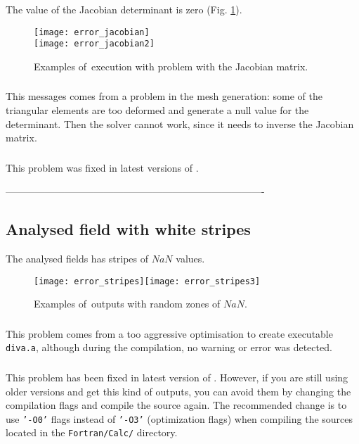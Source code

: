 The value of the Jacobian determinant is zero (Fig. \ref{fig:error_jacobian}).
\begin{figure}[htpb]
\centering
\texttt{[image: error\_jacobian]}\\
\texttt{[image: error\_jacobian2]}
\caption{Examples of \diva\,execution with problem with the Jacobian matrix. \label{fig:error_jacobian}}
\end{figure}

\subsubsection{\question}

This messages comes from a problem in the mesh generation: some of the triangular elements are too deformed and generate a null value for the determinant. Then the solver cannot work, since it needs to inverse the Jacobian matrix.


\subsubsection{\answer}

This problem was fixed in latest versions of \diva. 

-------------------------------------------------------------------------------

\subsection{Analysed field with white stripes}

The analysed fields has stripes of $NaN$ values.

\begin{figure}[htpb]
\centering
\texttt{[image: error\_stripes]}\texttt{[image: error\_stripes3]}
\caption{Examples of \diva\,outputs with random zones of $NaN$. \label{fig:error_stripes}}
\end{figure}

\subsubsection{\question}

This problem comes from a too aggressive optimisation to create executable \texttt{diva.a}, although during the compilation, no warning or error was detected.  

\subsubsection{\answer}

This problem has been fixed in latest version of \diva. However, if you are still using older versions and get this kind of outputs, you can avoid them by changing the compilation flags and compile the source again. The recommended change is to use \texttt{'-O0'} flags instead of \texttt{'-O3'} (optimization flags) when compiling the sources located in the \texttt{Fortran/Calc/} directory.
